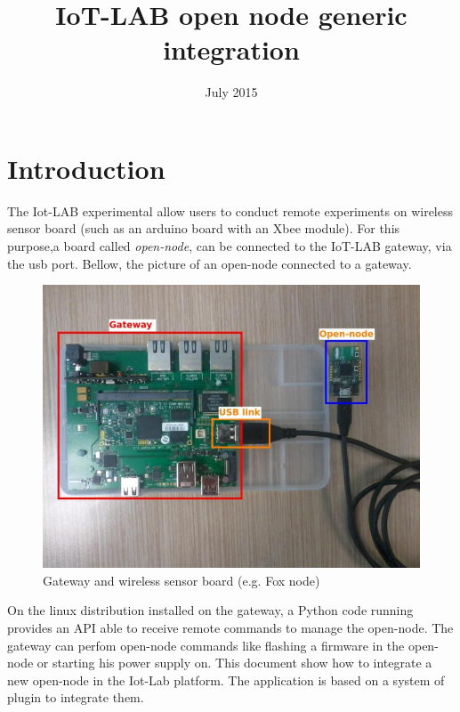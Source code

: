 \documentclass[12pt,a4paper,twoside]{article}
\title{IoT-LAB open node generic integration}
\author{ }
\date{July 2015}
\begin{document}
 

\maketitle

\section{Introduction}
The Iot-LAB experimental allow users to conduct remote experiments on wireless sensor board (such as an arduino board with an Xbee module).
For this purpose,a board called \textit{open-node}, can be connected to the IoT-LAB gateway, via the usb port.\newline
Bellow, the picture of an open-node connected to a gateway.\newline
\begin{figure}[H]
\centering
\includegraphics[scale=0.4]{gateway.jpg}
\caption{Gateway and wireless sensor board (e.g. Fox node)}
\label{fig1}
\end{figure}
On the linux distribution installed on the gateway, a Python code running provides an API able to receive remote commands to manage the open-node. The gateway can perfom open-node commands like flashing a firmware in the open-node or starting his power supply on. \newline
This document show how to integrate a new open-node in the Iot-Lab platform.\newline
The application is based on a system of plugin to integrate them.
\end{document}

